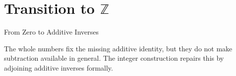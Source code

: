 
\section{Transition to \texorpdfstring{$\mathbb{Z}$}{Z}}
\label{sec:transition-to-z}
\begin{topicbox}{From Zero to Additive Inverses}
\begin{exposition}
The whole numbers fix the missing additive identity, but they do not make
subtraction available in general. The integer construction repairs this by
adjoining additive inverses formally.
\end{exposition}
\end{topicbox}
